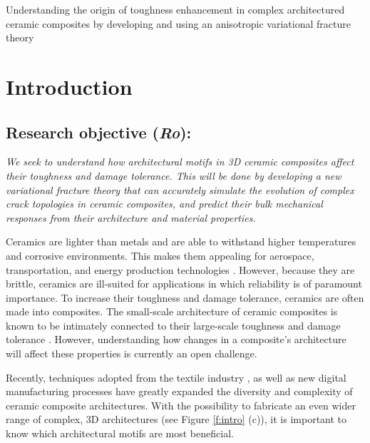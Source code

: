 \documentclass[10pt,letterpaper]{article}
\begin{document}
\setcounter{page}{1}

\begin{center}
  \fontsize{12}{2em}
  \selectfont
  Understanding the origin of toughness enhancement in complex architectured ceramic composites by developing and using an anisotropic variational fracture theory
\end{center}

\section{Introduction}
  \label{s:Intro}

  \subsection{Research objective (\emph{Ro}):}
    \label{s:ro}
    \emph{We seek to understand how architectural motifs in 3D ceramic composites affect their toughness and damage tolerance. This will be done by developing a new variational fracture theory that can accurately simulate the evolution of complex crack topologies in ceramic composites, and predict their bulk mechanical responses from their architecture and material properties.}

    Ceramics are lighter than metals and are able to withstand higher temperatures and corrosive environments. This makes them appealing for aerospace, transportation, and energy production technologies \cite{padture2016advanced}. However, because they are brittle, ceramics are ill-suited for applications in which reliability is of paramount importance. To increase their toughness and damage tolerance, ceramics are often made into composites. The small-scale architecture of ceramic composites is known to be intimately connected to their large-scale toughness and damage tolerance \cite{clegg1990simple,meyers2013structural,kolednik2011bioinspired}. However, understanding how changes in a composite's architecture will affect these properties is currently an open challenge.

    Recently, techniques adopted from the textile industry \cite{padture2016advanced}, as well as new digital manufacturing processes \cite{minatto2015multilayered,karambelas2013strombus,barthelat2015architectured,corni2012review} have greatly expanded the diversity and complexity of ceramic composite architectures. With the possibility to fabricate an even wider range of complex, 3D architectures (see Figure \ref{f:intro} (c)), it is important to know which architectural motifs are most beneficial.
\end{document}

